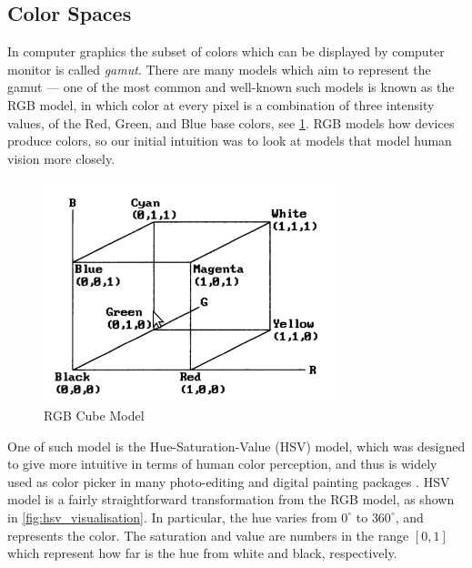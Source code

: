 \documentclass{report}
\begin{document}
\subsection{Color Spaces}
\label{sec:colorSpaces} 
In computer graphics the subset of colors which can be displayed by computer monitor is called \emph{gamut}\cite{color_model_ref}. There are many models which aim to represent the gamut --- one of the most common and well-known such models is known as the RGB model, in which color at every pixel is a combination of three intensity values, of the Red, Green, and Blue base colors, see \ref{fig:rgb_cube}. RGB models how devices produce colors, so our initial intuition was to look at models that model human vision more closely.  
\begin{figure}[hbtp]
\centering
\includegraphics[scale=0.5]{graphics/rgb_cube.png}
\caption{RGB Cube Model}
\label{fig:rgb_cube}
\end{figure}

One of such model is the Hue-Saturation-Value (HSV) model, which was designed to give more intuitive in terms of human color perception, and thus is widely used as color picker in many photo-editing and digital painting packages \cite{color_model_ref}.
HSV model is a fairly straightforward transformation from the RGB model, as shown in \ref{fig:hsv_visualisation}. In particular, the hue varies from $0^{\circ}$ to $360^{\circ}$, and represents the color. The saturation and value are numbers in the range $[0,1]$ which represent how far is the hue from white and black, respectively.
\end{document}
